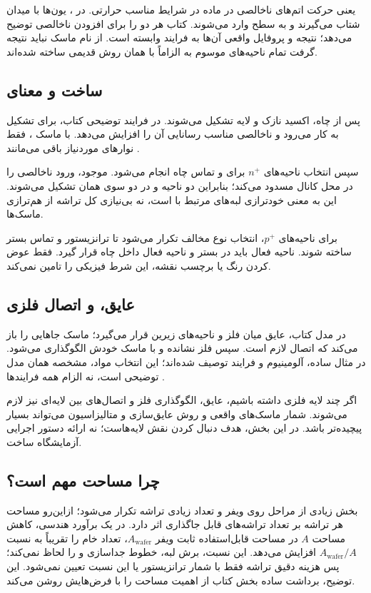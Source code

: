  یعنی حرکت اتم‌های ناخالصی در ماده در شرایط مناسب حرارتی.
در ، یون‌ها با میدان شتاب می‌گیرند و به سطح وارد می‌شوند.
کتاب هر دو را برای افزودن ناخالصی توضیح می‌دهد؛ نتیجه و پروفایل واقعی آن‌ها
به فرایند وابسته است. از نام ماسک  نباید نتیجه گرفت تمام
ناحیه‌های موسوم به  الزاماً با همان روش قدیمی ساخته شده‌اند.

\subsection{ساخت  و معنای }
پس از چاه، اکسید نازک  و لایه  تشکیل می‌شوند.
در فرایند توضیحی کتاب،  برای تشکیل
 به کار می‌رود و ناخالصی مناسب رسانایی آن را افزایش می‌دهد.
با ماسک ، فقط نوارهای موردنیاز باقی می‌مانند
\cite[شکل ]{weste}.

سپس انتخاب ناحیه‌های \(n^+\) برای  و تماس چاه انجام می‌شود.
 موجود، ورود ناخالصی را در محل کانال مسدود می‌کند؛
بنابراین دو ناحیه  و  در دو سوی همان 
تشکیل می‌شوند. این  به معنی خودترازی لبه‌های مرتبط با
 است، نه بی‌نیازی کل تراشه از هم‌ترازی ماسک‌ها.

برای ناحیه‌های \(p^+\)، انتخاب نوع مخالف تکرار می‌شود تا 
ترانزیستور  و تماس بستر ساخته شوند.
ناحیه فعال  باید در بستر  و ناحیه فعال  داخل چاه
 قرار گیرد. فقط عوض کردن رنگ یا برچسب نقشه، این شرط فیزیکی را تامین نمی‌کند.

\subsection{عایق،  و اتصال فلزی}
در مدل کتاب، عایق میان فلز و ناحیه‌های زیرین قرار می‌گیرد؛ ماسک 
جاهایی را باز می‌کند که اتصال لازم است. سپس فلز نشانده و با ماسک خودش الگوگذاری می‌شود.
در مثال ساده، آلومینیوم و فرایند  توصیف شده‌اند؛
این انتخاب مواد، مشخصه همان مدل توضیحی است، نه الزام همه فرایندها
\cite[شکل ]{weste}.

اگر چند لایه فلزی داشته باشیم، عایق، الگوگذاری فلز و اتصال‌های بین لایه‌ای
نیز لازم می‌شوند. شمار ماسک‌های واقعی و روش عایق‌سازی و متالیزاسیون می‌تواند
بسیار پیچیده‌تر باشد. در این بخش، هدف دنبال کردن نقش لایه‌هاست؛
نه ارائه دستور اجرایی آزمایشگاه ساخت.

\subsection{چرا مساحت مهم است؟}
بخش زیادی از مراحل روی ویفر و تعداد زیادی تراشه تکرار می‌شود؛
ازاین‌رو مساحت هر تراشه بر تعداد تراشه‌های قابل جاگذاری اثر دارد.
در یک برآورد هندسی، کاهش مساحت \(A\) در مساحت قابل‌استفاده ثابت ویفر
\(A_{\mathrm{wafer}}\)، تعداد خام را تقریباً به نسبت
\(A_{\mathrm{wafer}}/A\) افزایش می‌دهد.
این نسبت، برش لبه، خطوط جداسازی و  را لحاظ نمی‌کند؛
پس هزینه دقیق تراشه فقط با شمار ترانزیستور یا این نسبت تعیین نمی‌شود.
این توضیح، برداشت ساده بخش  کتاب از اهمیت مساحت را با فرض‌هایش روشن می‌کند.

